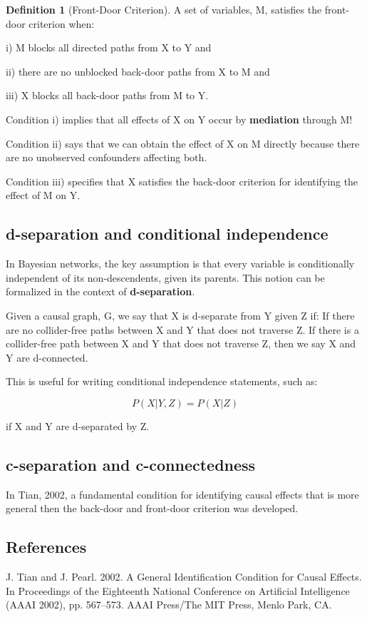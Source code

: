 \documentclass[class=article, crop=false]{standalone}
\theoremstyle{definition}
\newtheorem{definition}{Definition}[section]
\theoremstyle{remark}
\theoremstyle{lemma}
\theoremstyle{theorem}
\theoremstyle{corollary}
\theoremstyle{property}
\begin{document}
		\begin{definition} [Front-Door Criterion]
			A set of variables, M, satisfies the front-door criterion when:

			i) M blocks all directed paths from X to Y and 

			ii) there are no unblocked back-door paths from X to M and 

			iii) X blocks all back-door paths from M to Y.

			Condition i) implies that all effects of X on Y occur by \textbf{mediation} through M!

			Condition ii) says that we can obtain the effect of X on M directly because there are no unobserved confounders affecting both.

			Condition iii) specifies that X satisfies the back-door criterion for identifying the effect of M on Y.
		\end{definition}

	\subsection{d-separation and conditional independence}
		In Bayesian networks, the key assumption is that every variable is conditionally independent of its non-descendents, given its parents. This notion can be formalized in the context of \textbf{d-separation}.

		Given a causal graph, G, we say that X is d-separate from Y given Z if: If there are no collider-free paths between X and Y that does not traverse Z. If there is a collider-free path between X and Y that does not traverse Z, then we say X and Y are d-connected.

		This is useful for writing conditional independence statements, such as:

			$$P(X | Y, Z) = P(X | Z)$$

		if X and Y are d-separated by Z. 

	\subsection{c-separation and c-connectedness}
		In Tian, 2002, a fundamental condition for identifying causal effects that is more general then the back-door and front-door criterion was developed.

	\subsection{References}
		J. Tian and J. Pearl. 2002. A General Identification Condition for Causal Effects. In Proceedings of the Eighteenth National Conference on Artificial Intelligence (AAAI 2002), pp. 567–573. AAAI Press/The MIT Press, Menlo Park, CA.
\end{document}
